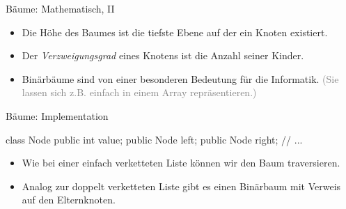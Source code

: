 \begin{frame}{Bäume: Mathematisch, II}
    \begin{itemize}[<+(1)->]
        \widei
        \item Die Höhe des Baumes ist die tiefste Ebene auf der ein Knoten existiert.
        \item Der \textit{Verzweigungsgrad} eines Knotens ist die Anzahl seiner Kinder.
        \item Binärbäume sind von einer besonderen Bedeutung für die Informatik.\pause{} \textcolor{gray}{(Sie lassen sich z.B. einfach in einem Array repräsentieren.)}
    \end{itemize}
\end{frame}

\begin{frame}[fragile]{Bäume: Implementation}
    \pause{}
    \begin{minipage}[c]{.4\linewidth}
\small%
\begin{plainjava}
class Node {
    public int value;
    public Node left;
    public Node right;
    // ...
}
\end{plainjava}
    \end{minipage}\hfill{}\pause{}\begin{minipage}[c]{.55\linewidth}%
\centering{}
\end{minipage}\vfill
    \begin{itemize}[<+(1)->]
        \widei
        \item Wie bei einer einfach verketteten Liste können wir den Baum traversieren.
        \item Analog zur doppelt verketteten Liste gibt es einen Binärbaum mit Verweis auf den Elternknoten.
    \end{itemize}
\end{frame}

